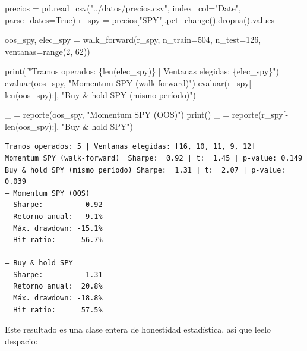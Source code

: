 \documentclass[
  spanish,
  letterpaper,
  DIV=11,
  numbers=noendperiod]{scrreprt}
\newenvironment{Shaded}{\begin{snugshade}}{\end{snugshade}}
\newcommand{\BuiltInTok}[1]{\textcolor[rgb]{0.00,0.23,0.31}{#1}}
\newcommand{\DecValTok}[1]{\textcolor[rgb]{0.68,0.00,0.00}{#1}}
\newcommand{\NormalTok}[1]{\textcolor[rgb]{0.00,0.23,0.31}{#1}}
\newcommand{\OperatorTok}[1]{\textcolor[rgb]{0.37,0.37,0.37}{#1}}
\newcommand{\SpecialCharTok}[1]{\textcolor[rgb]{0.37,0.37,0.37}{#1}}
\newcommand{\SpecialStringTok}[1]{\textcolor[rgb]{0.13,0.47,0.30}{#1}}
\newcommand{\StringTok}[1]{\textcolor[rgb]{0.13,0.47,0.30}{#1}}
\newcommand{\VariableTok}[1]{\textcolor[rgb]{0.07,0.07,0.07}{#1}}
\begin{document}
\label{wf-datos-reales}
\begin{Shaded}
\begin{Highlighting}[]
\NormalTok{precios }\OperatorTok{=}\NormalTok{ pd.read\_csv(}\StringTok{"../datos/precios.csv"}\NormalTok{, index\_col}\OperatorTok{=}\StringTok{"Date"}\NormalTok{, parse\_dates}\OperatorTok{=}\VariableTok{True}\NormalTok{)}
\NormalTok{r\_spy }\OperatorTok{=}\NormalTok{ precios[}\StringTok{"SPY"}\NormalTok{].pct\_change().dropna().values}

\NormalTok{oos\_spy, elec\_spy }\OperatorTok{=}\NormalTok{ walk\_forward(r\_spy, n\_train}\OperatorTok{=}\DecValTok{504}\NormalTok{, n\_test}\OperatorTok{=}\DecValTok{126}\NormalTok{, ventanas}\OperatorTok{=}\BuiltInTok{range}\NormalTok{(}\DecValTok{2}\NormalTok{, }\DecValTok{62}\NormalTok{))}

\BuiltInTok{print}\NormalTok{(}\SpecialStringTok{f"Tramos operados: }\SpecialCharTok{\{}\BuiltInTok{len}\NormalTok{(elec\_spy)}\SpecialCharTok{\}}\SpecialStringTok{ | Ventanas elegidas: }\SpecialCharTok{\{}\NormalTok{elec\_spy}\SpecialCharTok{\}}\SpecialStringTok{"}\NormalTok{)}
\NormalTok{evaluar(oos\_spy, }\StringTok{"Momentum SPY (walk{-}forward)"}\NormalTok{)}
\NormalTok{evaluar(r\_spy[}\OperatorTok{{-}}\BuiltInTok{len}\NormalTok{(oos\_spy):], }\StringTok{"Buy \& hold SPY (mismo período)"}\NormalTok{)}

\NormalTok{\_ }\OperatorTok{=}\NormalTok{ reporte(oos\_spy, }\StringTok{"Momentum SPY (OOS)"}\NormalTok{)}
\BuiltInTok{print}\NormalTok{()}
\NormalTok{\_ }\OperatorTok{=}\NormalTok{ reporte(r\_spy[}\OperatorTok{{-}}\BuiltInTok{len}\NormalTok{(oos\_spy):], }\StringTok{"Buy \& hold SPY"}\NormalTok{)}
\end{Highlighting}
\end{Shaded}

\begin{verbatim}
Tramos operados: 5 | Ventanas elegidas: [16, 10, 11, 9, 12]
Momentum SPY (walk-forward)  Sharpe:  0.92 | t:  1.45 | p-value: 0.149
Buy & hold SPY (mismo período) Sharpe:  1.31 | t:  2.07 | p-value: 0.039
— Momentum SPY (OOS)
  Sharpe:          0.92
  Retorno anual:   9.1%
  Máx. drawdown: -15.1%
  Hit ratio:      56.7%

— Buy & hold SPY
  Sharpe:          1.31
  Retorno anual:  20.8%
  Máx. drawdown: -18.8%
  Hit ratio:      57.5%
\end{verbatim}

Este resultado es una clase entera de honestidad estadística, así que
leelo despacio:
\end{document}

